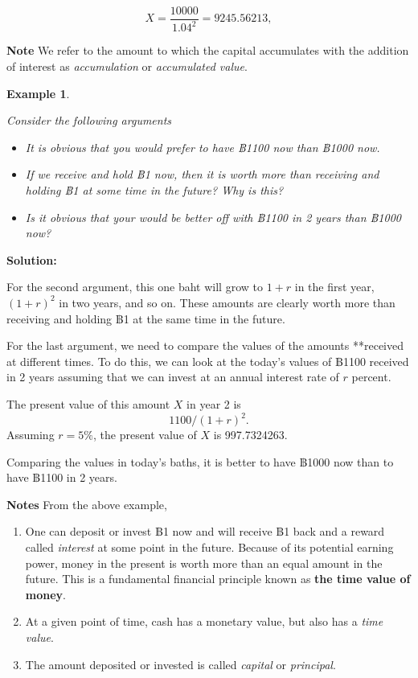 \documentclass[
]{book}
\theoremstyle{definition}
\theoremstyle{definition}
\newtheorem{example}{Example}[chapter]
\theoremstyle{definition}
\theoremstyle{definition}
\theoremstyle{remark}
\begin{document}
\[X = \frac{10000}{1.04^2} = 9245.56213,\]

\textbf{Note} We refer to the amount to which the capital accumulates with
the addition of interest as \emph{accumulation} or \emph{accumulated value}.

\begin{example}
\protect\hypertarget{exm:unlabeled-div-2}{}\label{exm:unlabeled-div-2}

\emph{Consider the following arguments}

\begin{itemize}
\item
  \emph{It is obvious that you would prefer to have ฿1100 now than ฿1000
  now.}
\item
  \emph{If we receive and hold ฿1 now, then it is worth more than receiving
  and holding ฿1 at some time in the future? Why is this?}
\item
  \emph{Is it obvious that your would be better off with ฿1100 in 2 years
  than ฿1000 now?}
\end{itemize}

\end{example}

\textbf{Solution:}

For the second argument, this one baht will grow to \(1 + r\) in the first
year, \((1 + r)^2\) in two years, and so on. These amounts are clearly
worth more than receiving and holding ฿1 at the same time in the future.

For the last argument, we need to compare the values of the amounts
**received at different times. To do this, we can look at the today's
values of ฿1100 received in 2 years assuming that we can invest at an
annual interest rate of \(r\) percent.

The present value of this amount \(X\) in year 2 is \[ 1100/(1 + r)^2.\] Assuming \(r = 5\%\), the present value of \(X\) is 997.7324263.

Comparing the values in today's baths, it is better to
have ฿1000 now than to have ฿1100 in 2 years.

\textbf{Notes} From the above example,

\begin{enumerate}
\def\labelenumi{\arabic{enumi}.}
\item
  One can deposit or invest ฿1 now and will receive ฿1 back and a
  reward called \emph{interest} at some point in the future. Because of its
  potential earning power, money in the present is worth more than an
  equal amount in the future. This is a fundamental financial
  principle known as \textbf{the time value of money}.
\item
  At a given point of time, cash has a monetary value, but also has a
  \emph{time value}.
\item
  The amount deposited or invested is called \emph{capital} or \emph{principal}.
\end{enumerate}
\end{document}
